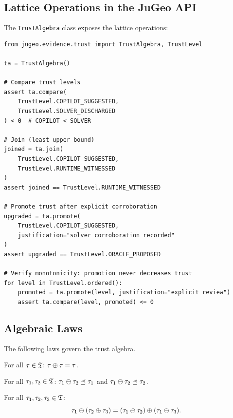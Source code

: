 \documentclass[11pt]{article}
\begin{document}
\subsection{Lattice Operations in the JuGeo API}

The \texttt{TrustAlgebra} class exposes the lattice operations:

\begin{lstlisting}[style=jugeo-python]
from jugeo.evidence.trust import TrustAlgebra, TrustLevel

ta = TrustAlgebra()

# Compare trust levels
assert ta.compare(
    TrustLevel.COPILOT_SUGGESTED,
    TrustLevel.SOLVER_DISCHARGED
) < 0  # COPILOT < SOLVER

# Join (least upper bound)
joined = ta.join(
    TrustLevel.COPILOT_SUGGESTED,
    TrustLevel.RUNTIME_WITNESSED
)
assert joined == TrustLevel.RUNTIME_WITNESSED

# Promote trust after explicit corroboration
upgraded = ta.promote(
    TrustLevel.COPILOT_SUGGESTED,
    justification="solver corroboration recorded"
)
assert upgraded == TrustLevel.ORACLE_PROPOSED

# Verify monotonicity: promotion never decreases trust
for level in TrustLevel.ordered():
    promoted = ta.promote(level, justification="explicit review")
    assert ta.compare(level, promoted) <= 0
\end{lstlisting}

\subsection{Algebraic Laws}

The following laws govern the trust algebra.

\begin{lemma}\label{lem:join-idemp}
For all $\tau \in \mathfrak{T}$: $\tau \oplus \tau = \tau$.
\end{lemma}

\begin{lemma}\label{lem:atten-bound}
For all $\tau_1, \tau_2 \in \mathfrak{T}$:
$\tau_1 \ominus \tau_2 \preceq \tau_1$ and
$\tau_1 \ominus \tau_2 \preceq \tau_2$.
\end{lemma}

\begin{lemma}\label{lem:join-atten-distrib}
For all $\tau_1, \tau_2, \tau_3 \in \mathfrak{T}$:
\[
  \tau_1 \ominus (\tau_2 \oplus \tau_3)
  = (\tau_1 \ominus \tau_2) \oplus (\tau_1 \ominus \tau_3).
\]
\end{lemma}
\end{document}

